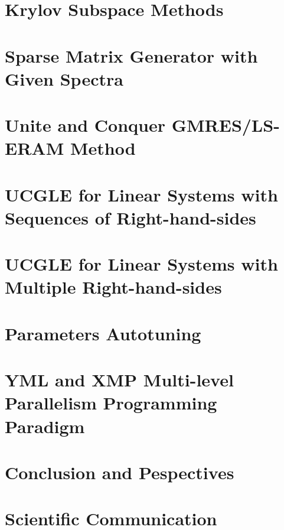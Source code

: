 \documentclass{xinzhewu}
\begin{document}
\chapter{Krylov Subspace Methods}\label{Krylov Subspace Methods}



\chapter{Sparse Matrix Generator with Given Spectra}\label{Sparse Matrix Generator with Given Spectra}



\chapter[Unite and Conquer GMRES/LS-ERAM Method]{Unite and Conquer GMRES/LS-ERAM Method}\label{Unite and Conquer GMRES/LS-ERAM Method}



\chapter{UCGLE for Linear Systems with Sequences of Right-hand-sides}\label{UCGLE for Linear Systems with Sequences of Right-hand-sides}



\chapter{UCGLE for Linear Systems with Multiple Right-hand-sides} \label{UCGLE for Linear Systems with Multiple Right-hand-sides}



\chapter{Parameters Autotuning}  \label{Parameters Autotuning}



\chapter{YML and XMP Multi-level Parallelism Programming Paradigm} \label{YML and XMP Multi-level Parallelism Programming Paradigm}



\chapter{Conclusion and Pespectives} \label{Conclusion and Pespectives}



\chapter*{Scientific Communication}




\clearemptydoublepage
\end{document}
